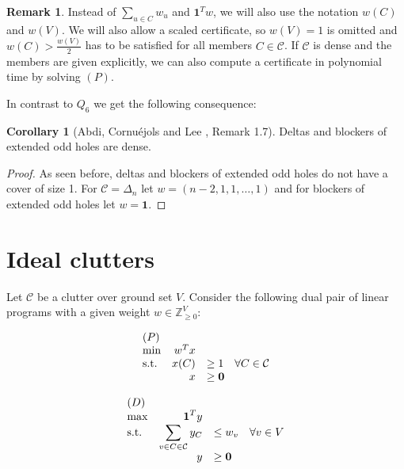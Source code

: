 \documentclass[a4paper, 12pt]{scrbook}
\theoremstyle{definition}
\newtheorem*{remark}{Remark}
\newtheorem{corollary}[theorem]{Corollary}
\newcommand*{\IZ}{\ensuremath{\mathbb{Z}}}
\begin{document}
\begin{remark}
    Instead of $\sum_{u \in C} w_u$ and $\textbf{1}^Tw$, we will also use the notation $w(C)$ and $w(V)$. We will also allow a scaled certificate, so $w(V)=1$ is omitted and $w(C) > \frac {w(V)}{2}$ has to be satisfied for all members $C \in \mathcal{C}$. If $\mathcal{C}$ is dense and the members are given explicitly, we can also compute a certificate in polynomial time by solving $(P)$.
\end{remark}

In contrast to $Q_6$ we get the following consequence:
\begin{corollary}[Abdi, Cornuéjols and Lee \cite{restrictions}, Remark 1.7]
    Deltas and blockers of extended odd holes are dense.
\end{corollary}

\begin{proof}
    As seen before, deltas and blockers of extended odd holes do not have a cover of size 1.
    For $\mathcal{C}=\Delta_n$ let $w=(n-2,1,1,\ldots,1)$ and for blockers of extended odd holes let $w=\textbf{1}$.
\end{proof}

\section{Ideal clutters}
Let $\mathcal{C}$ be a clutter over ground set $V$. Consider the following dual pair of linear programs with a given weight $w \in \IZ^V_{\geq 0}$:

    \begin{minipage}{.4\textwidth}
        \begin{equation*}
            \begin{array}{l@{\quad} r l l}
                (P)\\
                \min          &w^Tx   \\
                \mathrm{s.t.}  &x(C) &\geq  1 \quad \forall C \in \mathcal{C} \\
                    &   x &\geq   \textbf{0}
            \end{array}
        \end{equation*}
    \end{minipage}
    \begin{minipage}{.4\textwidth}
        \begin{equation*}
            \begin{array}{l@{\quad} r l l}
                (D)\\
                \max          &\textbf{1}^Ty   \\
                \mathrm{s.t.}  &\displaystyle\sum\limits_{v \in C \in \mathcal{C}} y_C &\leq  w_v \quad \forall v \in V \\
                    &   y &\geq   \textbf{0}
            \end{array}
        \end{equation*}
    \end{minipage}
\end{document}
